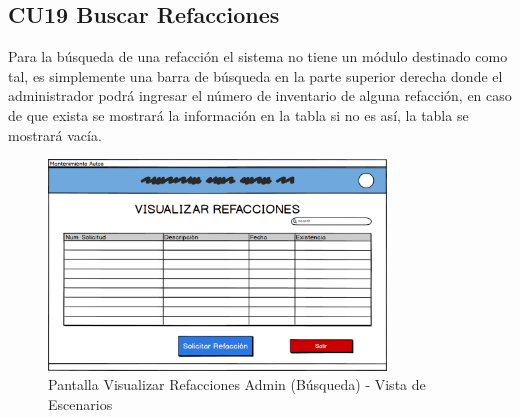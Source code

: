 \subsection{CU19 Buscar Refacciones}
Para la búsqueda de una refacción el sistema no tiene un módulo destinado como tal, es simplemente una barra de búsqueda en la parte superior derecha donde el administrador podrá ingresar el número de inventario de alguna refacción, en caso de que exista se mostrará la información en la tabla si no es así, la tabla se mostrará vacía. 
\begin{figure}[!h]
	\centering
	\includegraphics[width=0.8\textwidth]{./diseno/vescenarios/imagenes/visualizarRefacciones}
	\caption{Pantalla Visualizar Refacciones Admin (Búsqueda) - Vista de Escenarios}
	\label{fig:Pantalla refacciones busqueda- Vista de Escenarios}
\end{figure}
\clearpage